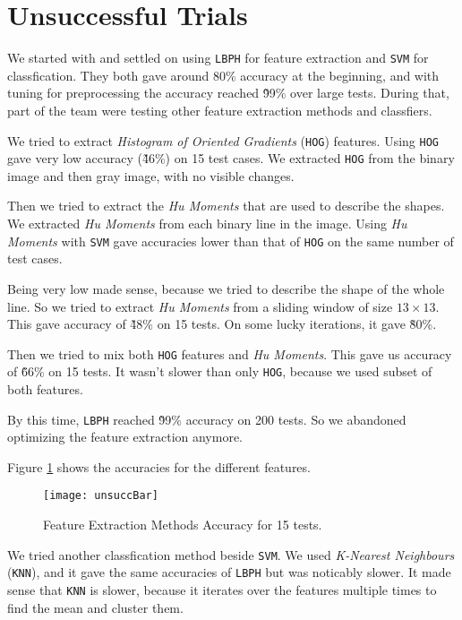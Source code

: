 \section{Unsuccessful Trials}
We started with and settled on using \texttt{LBPH} for feature extraction and \texttt{SVM} for classfication.
They both gave around 80\% accuracy at the beginning, and with tuning for preprocessing the accuracy reached \~99\% over large tests.
During that, part of the team were testing other feature extraction methods and classfiers.

We tried to extract \emph{Histogram of Oriented Gradients} (\texttt{HOG}) features.
Using \texttt{HOG} gave very low accuracy (\~46\%) on 15 test cases.
We extracted \texttt{HOG} from the binary image and then gray image, with no visible changes.

Then we tried to extract the \emph{Hu Moments} that are used to describe the shapes.
We extracted \emph{Hu Moments} from each binary line in the image.
Using \emph{Hu Moments} with \texttt{SVM} gave accuracies lower than that of \texttt{HOG} on the same number of test cases.

Being very low made sense, because we tried to describe the shape of the whole line.
So we tried to extract \emph{Hu Moments} from a sliding window of size $13\times13$.
This gave accuracy of \~48\% on 15 tests.
On some lucky iterations, it gave \~80\%.

Then we tried to mix both \texttt{HOG} features and \emph{Hu Moments}.
This gave us accuracy of \~66\% on 15 tests.
It wasn't slower than only \texttt{HOG}, because we used subset of both features.

By this time, \texttt{LBPH} reached \~99\% accuracy on 200 tests.
So we abandoned optimizing the feature extraction anymore.

Figure \ref{fig:unsuccBar} shows the accuracies for the different features.

\begin{figure}
    \centering
    \texttt{[image: unsuccBar]}
    \caption{Feature Extraction Methods Accuracy for 15 tests.}
    \label{fig:unsuccBar}
\end{figure}

We tried another classfication method beside \texttt{SVM}.
We used \emph{K-Nearest Neighbours} (\texttt{KNN}), and it gave the same accuracies of \texttt{LBPH} but was noticably slower.
It made sense that \texttt{KNN} is slower, because it iterates over the features multiple times to find the mean and cluster them.
